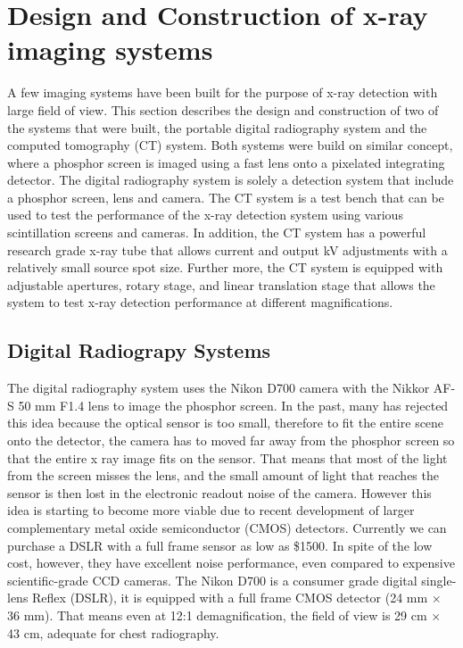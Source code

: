 \chapter{Design and Construction of x-ray imaging systems}
\label{chap:design_construction}

A few imaging systems have been built for the purpose of x-ray detection with large field of view.  This section describes the design and construction of two of the systems that were built, the portable digital radiography system and the computed tomography (CT) system.  Both systems were build on similar concept, where a phosphor screen is imaged using a fast lens onto a pixelated integrating detector.  The digital radiography system is solely a detection system that include a phosphor screen, lens and camera.  The CT system is a test bench that can be used to test the performance of the x-ray detection system using various scintillation screens and cameras.  In addition, the CT system has a powerful research grade x-ray tube that allows current and output kV adjustments with a relatively small source spot size.  Further more, the CT system is equipped with adjustable apertures, rotary stage, and linear translation stage that allows the system to test x-ray detection performance at different magnifications.

\section{Digital Radiograpy Systems}
The digital radiography system uses the Nikon D700 camera with the Nikkor AF-S 50 mm F1.4 lens to image the phosphor screen.  In the past, many has rejected this idea because the optical sensor is too small, therefore to fit the entire scene onto the detector, the camera has to moved far away from the phosphor screen so that the entire x ray image fits on the sensor.  That means that most of the light from the screen misses the lens, and the small amount of light that reaches the sensor is then lost in the electronic readout noise of the camera.   However this idea is starting to become more viable due to recent development of larger complementary metal oxide semiconductor (CMOS) detectors.  Currently we can purchase a DSLR with a full frame sensor as low as \$1500.  In spite of the low cost, however, they have excellent noise performance, even compared to expensive scientific-grade CCD cameras.  The Nikon D700 is a consumer grade digital single-lens Reflex (DSLR), it is equipped with a full frame CMOS detector (24 mm $\times$ 36 mm).  That means even at 12:1 demagnification, the field of view is 29 cm $\times$ 43 cm, adequate for chest radiography.  

